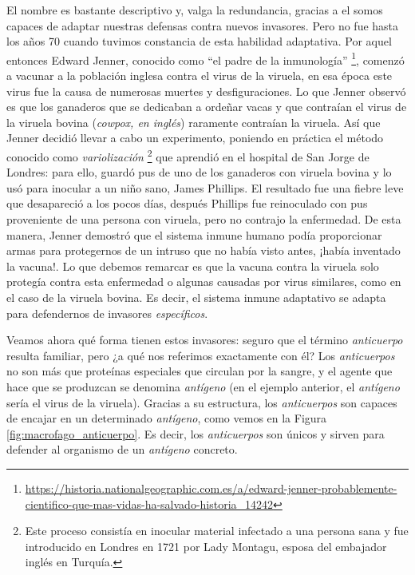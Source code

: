 El nombre es bastante descriptivo y, valga la redundancia, gracias a el somos capaces de adaptar nuestras defensas contra nuevos invasores. Pero no fue hasta los años 70 cuando tuvimos constancia de esta habilidad adaptativa. Por aquel entonces Edward Jenner, conocido como ``el padre de la inmunología'' \footnote{\url{https://historia.nationalgeographic.com.es/a/edward-jenner-probablemente-cientifico-que-mas-vidas-ha-salvado-historia_14242}}, comenzó a vacunar a la población inglesa contra el virus de la viruela, en esa época este virus fue la causa de numerosas muertes y desfiguraciones. Lo que Jenner observó es que los ganaderos que se dedicaban a ordeñar vacas y que contraían el virus de la viruela bovina (\textit{cowpox, en inglés}) raramente contraían la viruela. Así que Jenner decidió llevar a cabo un experimento, poniendo en práctica el método conocido como \textit{variolización} \footnote{Este proceso consistía en inocular material infectado a una persona sana y fue introducido en Londres en 1721 por  Lady Montagu, esposa del embajador inglés en Turquía.} que aprendió en el hospital de San Jorge de Londres: para ello, guardó pus de uno de los ganaderos con viruela bovina y lo usó para inocular a un niño sano, James Phillips. El resultado fue una fiebre leve que desapareció a los pocos días, después Phillips fue reinoculado con pus proveniente de una persona con viruela, pero no contrajo la enfermedad. De esta manera, Jenner demostró que el sistema inmune humano podía proporcionar armas para protegernos de un intruso que no había visto antes, ¡había inventado la vacuna!. Lo que debemos remarcar es que la vacuna contra la viruela solo protegía contra esta enfermedad o algunas causadas por virus similares, como en el caso de la viruela bovina. Es decir, el sistema inmune adaptativo se adapta para defendernos de invasores \textit{específicos}. 

Veamos ahora qué forma tienen estos invasores: seguro que el término \textit{anticuerpo} resulta familiar, pero ¿a qué nos referimos exactamente con él? Los \textit{anticuerpos} no son más que proteínas especiales que circulan por la sangre, y el agente que hace que se produzcan se denomina \textit{antígeno} (en el ejemplo anterior, el \textit{antígeno} sería el virus de la viruela). Gracias a su estructura, los \textit{anticuerpos} son capaces de encajar en un determinado \textit{antígeno}, como vemos en la Figura \ref{fig:macrofago_anticuerpo}. Es decir, los \textit{anticuerpos} son únicos y sirven para defender al organismo de un \textit{antígeno} concreto.

